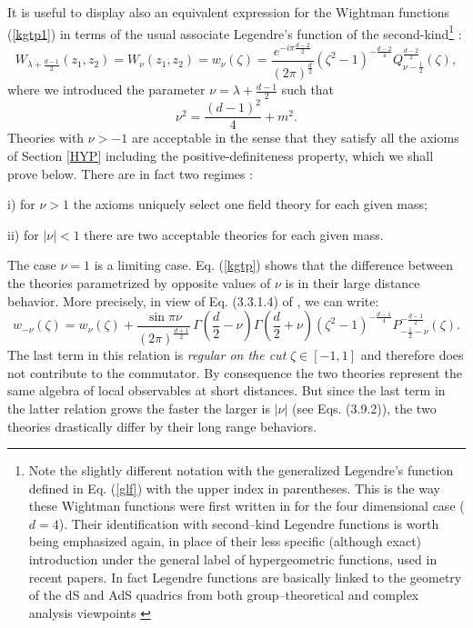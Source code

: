 \documentclass[a4paper,a4paper]{article}
\begin{document}
\vskip 0.2cm
It is useful to display also an equivalent expression for the
Wightman functions (\ref{kgtp1}) in terms of the usual associate
Legendre's function of the second-kind\footnote{Note the slightly
different notation with the generalized Legendre's function
defined in Eq. (\ref{glf}) with the upper index in parentheses.
This is the way these Wightman functions were first written in
\cite{Fronsdal:1974} for the four dimensional case ($d=4$). Their
identification with second--kind Legendre functions is worth
being emphasized again, in place of their less specific (although
exact) introduction under the general label of hypergeometric
functions, used in recent papers. In fact Legendre functions are
basically linked to the geometry of the dS and AdS quadrics from
both group--theoretical and complex analysis viewpoints
\cite{BV-2,BM,vilenkin}}  \cite{Bateman}:
\begin{equation}W_{\lambda + \frac{d-1}{2}}(z_1,z_2)=
 W_{\nu}(z_1,z_2) = w_\nu(\zeta) = \frac
{e^{-i\pi\frac {d-2}2}}{(2\pi)^{\frac{d}2}} (\zeta^2-1)^{-\frac
{d-2}4} Q^{\frac {d-2}2}_{\nu-\frac 1 2}(\zeta), \label{kgtp}
\end{equation}
%
where we introduced the parameter $\nu = \lambda + \frac{d-1}{2}$
such that
\begin{equation}
\nu^2  = \frac {({d-1})^2 }{4} + m^2. \label{nu}
\end{equation}
Theories with $\nu > -1$ are acceptable in the sense that they
satisfy all the axioms  of Section \ref{HYP} including the
positive-definiteness property, which we shall prove below.
There are in fact two regimes \cite{Breitenlohner:1982jf}:
\begin{description}
\item{i)}
for $\nu > 1$ the axioms uniquely select one field theory for each given mass;
\item{ii)} for $|\nu| < 1$ there are two acceptable theories for each given
mass.
\end{description}
The case $\nu = 1$ is a limiting case.
Eq. (\ref{kgtp}) shows that the difference
between the theories parametrized by opposite values of $\nu$ is in their
large distance behavior. More precisely, in view of Eq. (3.3.1.4) of
\cite{Bateman}, we can write:
\begin{equation}
w_{-\nu} (\zeta)  = w_{\nu} (\zeta)  + \frac{\sin
\pi\nu}{(2\pi)^{\frac{d+1}{2}}} \, \Gamma\left(\frac d 2-\nu\right) \Gamma
\left(\frac d 2 +\nu\right) (\zeta^2-1)^{-\frac {d-1}4}P^{-\frac
{d-1}2}_{-\frac 1 2 -\nu}(\zeta) .
\end{equation}
The last term in this relation is {\em regular on the cut}
$\zeta \in [-1,1]$ and therefore does not contribute to the
commutator. By consequence the two theories represent the same
algebra of local observables at short distances. But since the
last term in the latter relation grows the faster the larger is
$|\nu|$ (see \cite{Bateman} Eqs. (3.9.2)), the two theories
drastically differ by their long range behaviors.
\end{document}
